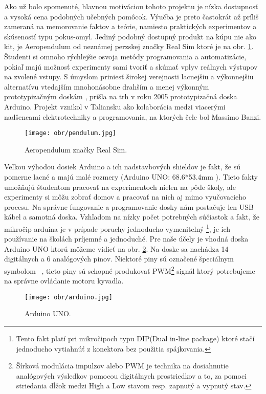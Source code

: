 Ako už bolo spomenuté, hlavnou motiváciou tohoto projektu je nízka dostupnosť a vysoká cena podobných učebných pomôcok. Výučba je preto častokrát až príliš zameraná na memorovanie faktov a teórie, namiesto praktických experimentov a skúseností typu pokus-omyl. Jediný podobný dostupný produkt na kúpu nie ako kit, je Aeropendulum od neznámej perzskej značky Real Sim ktoré je na obr. \ref{OBRAZOK 1.2}. Študenti si omnoho rýchlejšie osvoja metódy programovania a automatizácie, pokiaľ majú možnosť experimenty sami tvoriť a skúmať vplyv reálnych výstupov na zvolené vstupy. S úmyslom priniesť širokej verejnosti lacnejšiu a výkonnejšiu alternatívu vtedajším mnohonásobne drahším a menej výkonným prototypizačným doskám \cite{stamp}, prišla na trh v roku 2005 prototypizačná doska Arduino. Projekt vznikol v Taliansku ako kolaborácia medzi viacerými nadšencami elektrotechniky a programovania, na ktorých čele bol Massimo Banzi.

\begin{figure}[!tbh]
\centering
\texttt{[image: obr/pendulum.jpg]}
\caption{Aeropendulum značky Real Sim.}\label{OBRAZOK 1.2}
\end{figure}

Veľkou výhodou dosiek Arduino a ich nadstavbových shieldov je fakt, že sú pomerne lacné a majú malé rozmery (Arduino UNO: 68.6*53.4mm \cite{UNO} ). Tieto fakty umožňujú študentom pracovať na experimentoch nielen na pôde školy, ale experimenty si môžu zobrať domov a pracovať na nich aj mimo vyučovacieho procesu. Na správne fungovanie a programovanie dosky nám postačuje len USB kábel a samotná doska. Vzhľadom na nízky počet potrebných súčiastok a fakt, že mikročip arduina je v prípade poruchy jednoducho vymenitelný \footnote[2]{Tento fakt platí pri mikročipoch typu DIP(Dual in-line package) ktoré stačí jednoducho vytiahnúť z konektora bez použitia spájkovania.}, je ich používanie na školách príjemné a jednoduché. Pre naše účely je vhodná doska Arduino UNO ktorú môžeme vidieť na obr. \ref{OBRAZOK 1.3}. Na doske sa nachádza 14 digitálnych a 6 analógových pinov. Niektoré piny sú označené špeciálnym symbolom ~, tieto piny sú schopné produkovať PWM\footnote[3]{Šírková modulácia impulzov alebo PWM je technika na dosiahnutie analógových výsledkov pomocou digitálnych prostriedkov a to, za pomoci striedania dĺžok medzi High a Low stavom resp. zapnutý a vypnutý stav.} signál ktorý potrebujeme na správne ovládanie motoru kyvadla.

\begin{figure}[!tbh]
\centering
\texttt{[image: obr/arduino.jpg]}
\caption{Arduino UNO.}\label{OBRAZOK 1.3}
\end{figure}



